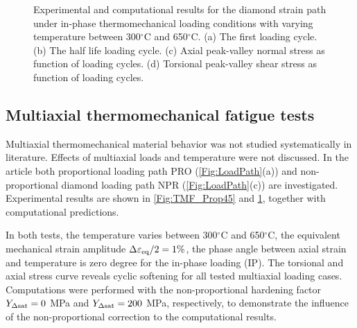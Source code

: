 \begin{figure}
\caption{Experimental and computational results for the diamond strain path under in-phase thermomechanical loading conditions with varying temperature between  300$^\circ$C and 650$^\circ$C. (a) The first loading cycle. (b) The half life loading cycle. (c) Axial peak-valley normal stress as function of loading cycles. (d) Torsional peak-valley shear stress as function of  loading cycles.}
\label{Fig:TMF_Diamond}
\end{figure}

\subsection{Multiaxial thermomechanical fatigue tests}
\noindent
Multiaxial thermomechanical material behavior was not studied systematically in literature. Effects of multiaxial loads and temperature were not discussed. In the article both proportional loading path PRO (\ref{Fig:LoadPath}(a)) and non-proportional diamond loading path NPR (\ref{Fig:LoadPath}(c)) are investigated. Experimental results are shown in \ref{Fig:TMF_Prop45} and \ref{Fig:TMF_Diamond}, together with computational predictions.

In both tests, the temperature varies between 300$^\circ$C and 650$^\circ$C, the equivalent mechanical strain amplitude $\Delta\varepsilon_{\rm{eq}}/2=1\%$, the phase angle between axial strain and temperature is zero degree for the in-phase loading (IP).
The torsional and axial stress curve reveals cyclic softening for all tested multiaxial loading cases.
Computations were performed with the non-proportional hardening factor $Y_{\Delta {\rm{sat}}}=0$ MPa and $Y_{\Delta {\rm{sat}}}=200$ MPa, respectively, to demonstrate the influence of the non-proportional correction to the computational results.

